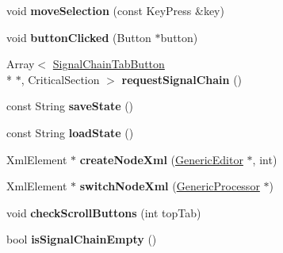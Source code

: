 \begin{DoxyCompactItemize}
\item 
\hypertarget{classEditorViewport_a49167a0ba2902fc95199ca4897f773c6}{void {\bfseries move\-Selection} (const Key\-Press \&key)}\label{classEditorViewport_a49167a0ba2902fc95199ca4897f773c6}

\item 
\hypertarget{classEditorViewport_a993f75f13ab62e1cea1ce38da1f046d5}{void {\bfseries button\-Clicked} (Button $\ast$button)}\label{classEditorViewport_a993f75f13ab62e1cea1ce38da1f046d5}

\item 
\hypertarget{classEditorViewport_aea2c840f1ca1309f483b7ff600e9e4ad}{Array$<$ \hyperlink{classSignalChainTabButton}{Signal\-Chain\-Tab\-Button} \\*
$\ast$, Critical\-Section $>$ {\bfseries request\-Signal\-Chain} ()}\label{classEditorViewport_aea2c840f1ca1309f483b7ff600e9e4ad}

\item 
\hypertarget{classEditorViewport_a00ade83a870133a9ddf339a38dd06b3c}{const String {\bfseries save\-State} ()}\label{classEditorViewport_a00ade83a870133a9ddf339a38dd06b3c}

\item 
\hypertarget{classEditorViewport_a2ae2ff8e05fca5d7717fbce441fb2412}{const String {\bfseries load\-State} ()}\label{classEditorViewport_a2ae2ff8e05fca5d7717fbce441fb2412}

\item 
\hypertarget{classEditorViewport_a231c3600cecadafa2b6c01dc39515c7b}{Xml\-Element $\ast$ {\bfseries create\-Node\-Xml} (\hyperlink{classGenericEditor}{Generic\-Editor} $\ast$, int)}\label{classEditorViewport_a231c3600cecadafa2b6c01dc39515c7b}

\item 
\hypertarget{classEditorViewport_a6d055783c0fe0c8cea45a9924b45d99a}{Xml\-Element $\ast$ {\bfseries switch\-Node\-Xml} (\hyperlink{classGenericProcessor}{Generic\-Processor} $\ast$)}\label{classEditorViewport_a6d055783c0fe0c8cea45a9924b45d99a}

\item 
\hypertarget{classEditorViewport_aada77ca562341a093410527034b10818}{void {\bfseries check\-Scroll\-Buttons} (int top\-Tab)}\label{classEditorViewport_aada77ca562341a093410527034b10818}

\item 
\hypertarget{classEditorViewport_a1b5cea1e2a181d39375b025a5c1dd047}{bool {\bfseries is\-Signal\-Chain\-Empty} ()}\label{classEditorViewport_a1b5cea1e2a181d39375b025a5c1dd047}

\end{DoxyCompactItemize}
